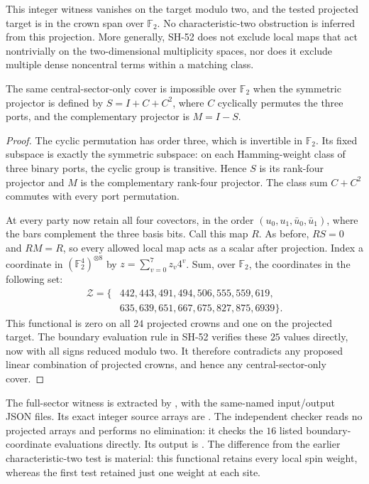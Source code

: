This integer witness vanishes on the target modulo two,
and the tested projected target is in the crown span over
$\mathbb F_2$.  No characteristic-two obstruction is inferred
from this projection.  More generally, SH-52 does not
exclude local maps that act nontrivially on the
two-dimensional multiplicity spaces, nor does it exclude
multiple dense noncentral terms within a matching class.

\begin{corollary}
\label{prop:cauchy-central-spin-f2}
The same central-sector-only cover is impossible over
$\mathbb F_2$ when the symmetric projector is defined by
$S=I+C+C^2$, where $C$ cyclically permutes the three ports,
and the complementary projector is $M=I-S$.
\end{corollary}
\begin{proof}
The cyclic permutation has order three, which is invertible
in $\mathbb F_2$.  Its fixed subspace is exactly the symmetric
subspace: on each Hamming-weight class of three binary ports,
the cyclic group is transitive.  Hence $S$ is its rank-four
projector and $M$ is the complementary rank-four projector.
The class sum $C+C^2$ commutes with every port permutation.

At every party now retain all four covectors, in the order
$(u_0,u_1,\bar u_0,\bar u_1)$, where the bars complement
the three basis bits.  Call this map $R$.  As before,
$RS=0$ and $RM=R$, so every allowed local map acts as a
scalar after projection.  Index a coordinate in
$(\mathbb F_2^4)^{\otimes8}$ by
$z=\sum_{v=0}^7z_v4^v$.  Sum, over $\mathbb F_2$, the
coordinates in the following set:
\[
\begin{split}
\mathcal Z=\{&442,443,491,494,506,555,559,619,\\
             &635,639,651,667,675,827,875,6939\}.
\end{split}
\]
This functional is zero on all $24$ projected crowns and
one on the projected target.  The boundary evaluation rule
in SH-52 verifies these $25$ values directly, now with all
signs reduced modulo two.  It therefore contradicts any
proposed linear combination of projected crowns, and hence
any central-sector-only cover.
\end{proof}

The full-sector witness is extracted by
, with the
same-named input/output JSON files.  Its exact integer
source arrays are
.
The independent checker
 reads
no projected arrays and performs no elimination: it checks
the $16$ listed boundary-coordinate evaluations directly.
Its output is
.
The difference from the earlier characteristic-two test is
material: this functional retains every local spin weight,
whereas the first test retained just one weight at each site.

